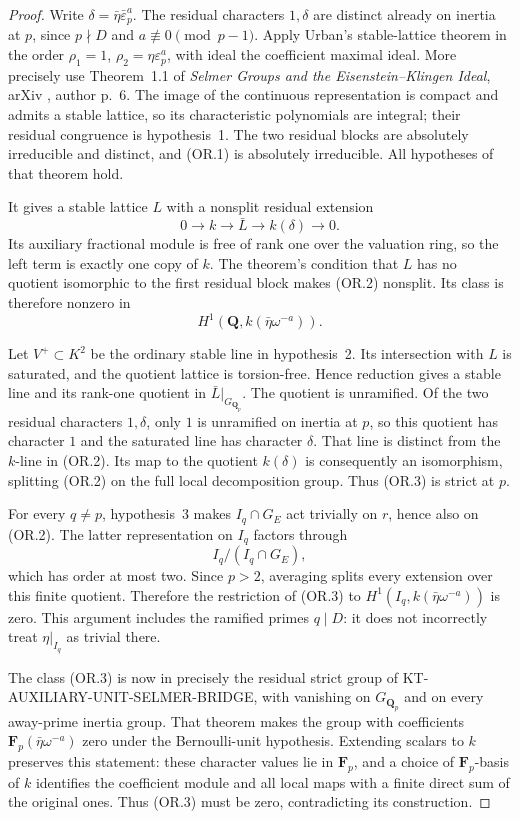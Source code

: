 \documentclass[11pt,a4paper]{article}
\theoremstyle{definition}
\begin{document}
\begin{proof}
Write $\delta=\bar\eta\bar\varepsilon_p^a$.
The residual characters $1,\delta$ are distinct
already on inertia at $p$, since $p\nmid D$ and
$a\not\equiv0\pmod{p-1}$.
Apply Urban's stable-lattice theorem in the order
$\rho_1=1$, $\rho_2=\eta\varepsilon_p^a$, with ideal
the coefficient maximal ideal.  More precisely use
Theorem~1.1 of \emph{Selmer Groups and the
Eisenstein--Klingen Ideal}, arXiv
, author p.~6.
The image of the continuous representation is
compact and admits a stable lattice, so its
characteristic polynomials are integral; their
residual congruence is hypothesis~1.  The two
residual blocks are absolutely irreducible and
distinct, and (OR.1) is absolutely irreducible.
All hypotheses of that theorem hold.

It gives a stable lattice $L$ with a nonsplit
residual extension
\[
 0\longrightarrow k\longrightarrow\bar L
       \longrightarrow k(\delta)\longrightarrow0.        \tag{OR.2}
\]
Its auxiliary fractional module is free of rank
one over the valuation ring, so the left term is
exactly one copy of $k$.  The theorem's condition
that $L$ has no quotient isomorphic to the first
residual block makes (OR.2) nonsplit.  Its class is
therefore nonzero in
\[
             H^1(\mathbf Q,k(\bar\eta\omega^{-a})).       \tag{OR.3}
\]

Let $V^+\subset K^2$ be the ordinary stable line
in hypothesis~2.  Its intersection with $L$ is
saturated, and the quotient lattice is torsion-free.
Hence reduction gives a stable line and its
rank-one quotient in $\bar L|_{G_{\mathbf Q_p}}$.
The quotient is unramified.  Of the two residual
characters $1,\delta$, only $1$ is unramified on
inertia at $p$, so this quotient has character $1$
and the saturated line has character $\delta$.
That line is distinct from the $k$-line in (OR.2).
Its map to the quotient $k(\delta)$ is consequently
an isomorphism, splitting (OR.2) on the full local
decomposition group.  Thus (OR.3) is strict at $p$.

For every $q\ne p$, hypothesis~3 makes
$I_q\cap G_E$ act trivially on $r$, hence also
on (OR.2).  The latter representation on $I_q$
factors through
\[
                     I_q/(I_q\cap G_E),                 \tag{OR.4}
\]
which has order at most two.  Since $p>2$,
averaging splits every extension over this finite
quotient.  Therefore the restriction of (OR.3)
to $H^1(I_q,k(\bar\eta\omega^{-a}))$ is zero.
This argument includes the ramified primes $q\mid D$:
it does not incorrectly treat $\eta|_{I_q}$ as
trivial there.

The class (OR.3) is now in precisely the residual
strict group of KT-AUXILIARY-UNIT-SELMER-BRIDGE,
with vanishing on $G_{\mathbf Q_p}$ and on every
away-prime inertia group.  That theorem makes
the group with coefficients
$\mathbf F_p(\bar\eta\omega^{-a})$ zero under the
Bernoulli-unit hypothesis.  Extending scalars to
$k$ preserves this statement: these character
values lie in $\mathbf F_p$, and a choice of
$\mathbf F_p$-basis of $k$ identifies the coefficient
module and all local maps with a finite direct
sum of the original ones.  Thus (OR.3) must be
zero, contradicting its construction.
\end{proof}
\end{document}

